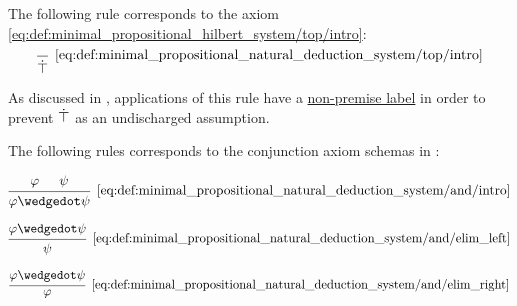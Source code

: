 \begin{definition}
\begin{thmenum}
     The following rule corresponds to the axiom \eqref{eq:def:minimal_propositional_hilbert_system/top/intro}:
    \begin{equation*}\taglabel[\( \top^+ \)]{eq:def:minimal_propositional_natural_deduction_system/top/intro}
      \begin{prooftree}
        \infer0[\ref{eq:def:minimal_propositional_natural_deduction_system/top/intro}]{ \syntop }
      \end{prooftree}
    \end{equation*}

    As discussed in , applications of this rule have a \hyperref[def:proof_tree/premises]{non-premise label} in order to prevent \( \dot\top \) as an undischarged assumption.

     The following rules corresponds to the conjunction axiom schemas in :

    \begin{minipage}{0.3\textwidth}
      \begin{equation*}\taglabel[\( \wedge^+ \)]{eq:def:minimal_propositional_natural_deduction_system/and/intro}
        \begin{prooftree}
          \hypo{ \varphi }
          \hypo{ \psi }
          \infer2[\ref{eq:def:minimal_propositional_natural_deduction_system/and/intro}]{ \varphi \synwedge \psi }
        \end{prooftree}
      \end{equation*}
    \end{minipage}
    \hfill
    \begin{minipage}{0.3\textwidth}
      \begin{equation*}\taglabel[\( \wedge^{-_L} \)]{eq:def:minimal_propositional_natural_deduction_system/and/elim_left}
        \begin{prooftree}
          \hypo{ \varphi \synwedge \psi }
          \infer1[\ref{eq:def:minimal_propositional_natural_deduction_system/and/elim_left}]{ \psi }
        \end{prooftree}
      \end{equation*}
    \end{minipage}
    \hfill
    \begin{minipage}{0.3\textwidth}
      \begin{equation*}\taglabel[\( \wedge^{-_R} \)]{eq:def:minimal_propositional_natural_deduction_system/and/elim_right}
        \begin{prooftree}
          \hypo{ \varphi \synwedge \psi }
          \infer1[\ref{eq:def:minimal_propositional_natural_deduction_system/and/elim_right}]{ \varphi }
        \end{prooftree}
      \end{equation*}
    \end{minipage}


\end{thmenum}
\end{definition}
